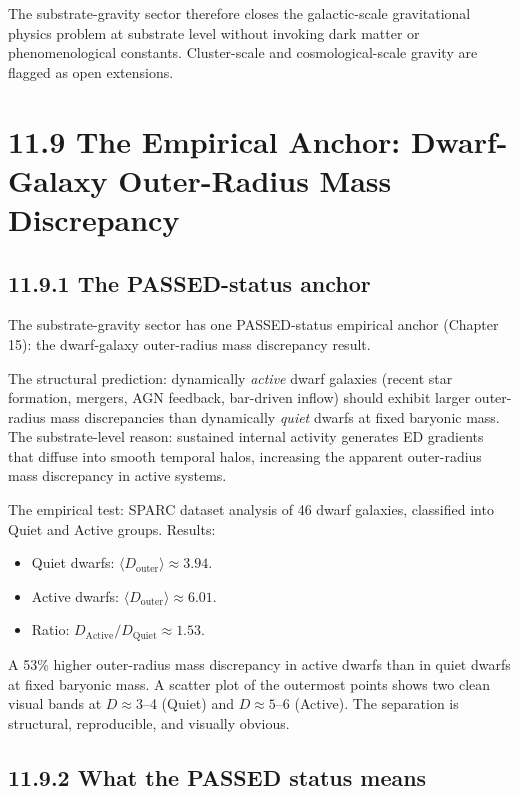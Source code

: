 \documentclass[11pt]{book}
\begin{document}
The substrate-gravity sector therefore closes the galactic-scale gravitational physics problem at substrate level without invoking dark matter or phenomenological constants. Cluster-scale and cosmological-scale gravity are flagged as open extensions.

\section{11.9 The Empirical Anchor: Dwarf-Galaxy Outer-Radius Mass Discrepancy}

\subsection{11.9.1 The PASSED-status anchor}

The substrate-gravity sector has one PASSED-status empirical anchor (Chapter 15): the dwarf-galaxy outer-radius mass discrepancy result.

The structural prediction: dynamically \textit{active} dwarf galaxies (recent star formation, mergers, AGN feedback, bar-driven inflow) should exhibit larger outer-radius mass discrepancies than dynamically \textit{quiet} dwarfs at fixed baryonic mass. The substrate-level reason: sustained internal activity generates ED gradients that diffuse into smooth temporal halos, increasing the apparent outer-radius mass discrepancy in active systems.

The empirical test: SPARC dataset analysis of 46 dwarf galaxies, classified into Quiet and Active groups. Results:
\begin{itemize}
\item Quiet dwarfs: $\langle D_\mathrm{outer}\rangle \approx 3.94$.
\item Active dwarfs: $\langle D_\mathrm{outer}\rangle \approx 6.01$.
\item Ratio: $D_\mathrm{Active}/D_\mathrm{Quiet} \approx 1.53$.
\end{itemize}

A 53\% higher outer-radius mass discrepancy in active dwarfs than in quiet dwarfs at fixed baryonic mass. A scatter plot of the outermost points shows two clean visual bands at $D \approx 3$–4 (Quiet) and $D \approx 5$–6 (Active). The separation is structural, reproducible, and visually obvious.

\subsection{11.9.2 What the PASSED status means}
\end{document}
